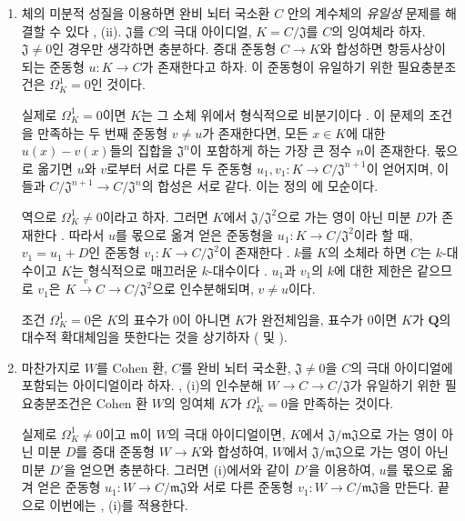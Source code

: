 \begin{remarks}[21.5.3]
\label{0.21.5.3-ko}
\begin{enumerate}
  \item[(i)] 체의 미분적 성질을 이용하면 완비 뇌터 국소환 $C$ 안의
  계수체의 \emph{유일성} 문제를 해결할 수 있다
  , (ii). $\mathfrak J$를 $C$의 극대 아이디얼,
  $K=C/\mathfrak J$를 $C$의 잉여체라 하자. $\mathfrak J\neq0$인 경우만
  생각하면 충분하다. 증대 준동형 $C\to K$와 합성하면 항등사상이 되는
  준동형 $u:K\to C$가 존재한다고 하자. 이 준동형이 유일하기 위한
  필요충분조건은 $\Omega^1_K=0$인 것이다.

  실제로 $\Omega^1_K=0$이면 $K$는 그 소체 위에서 형식적으로
  비분기이다 . 이 문제의 조건을 만족하는 두 번째
  준동형 $v\neq u$가 존재한다면, 모든 $x\in K$에 대한 $u(x)-v(x)$들의
  집합을 $\mathfrak J^n$이 포함하게 하는 가장 큰 정수 $n$이 존재한다.
  몫으로 옮기면 $u$와 $v$로부터 서로 다른 두 준동형
  $u_1,v_1:K\to C/\mathfrak J^{n+1}$이 얻어지며, 이들과
  $C/\mathfrak J^{n+1}\to C/\mathfrak J^n$의 합성은 서로 같다. 이는
  정의 에 모순이다.

  역으로 $\Omega^1_K\neq0$이라고 하자. 그러면 $K$에서
  $\mathfrak J/\mathfrak J^2$으로 가는 영이 아닌 미분 $D$가 존재한다
  . 따라서 $u$를 몫으로 옮겨 얻은 준동형을
  $u_1:K\to C/\mathfrak J^2$이라 할 때,
  $v_1=u_1+D$인 준동형 $v_1:K\to C/\mathfrak J^2$이 존재한다
  . $k$를 $K$의 소체라 하면 $C$는 $k$-대수이고
  $K$는 형식적으로 매끄러운 $k$-대수이다 .
  $u_1$과 $v_1$의 $k$에 대한 제한은 같으므로 $v_1$은
  $K\xrightarrow{v}C\to C/\mathfrak J^2$으로 인수분해되며,
  $v\neq u$이다.

  조건 $\Omega^1_K=0$은 $K$의 표수가 $0$이 아니면 $K$가
  완전체임을, 표수가 $0$이면 $K$가 $\mathbf Q$의 대수적 확대체임을
  뜻한다는 것을 상기하자
  ( 및 ).

  \item[(ii)] 마찬가지로 $W$를 Cohen 환, $C$를 완비 뇌터 국소환,
  $\mathfrak J\neq0$을 $C$의 극대 아이디얼에 포함되는 아이디얼이라
  하자. , (i)의 인수분해
  $W\to C\to C/\mathfrak J$가 유일하기 위한 필요충분조건은 Cohen 환
  $W$의 잉여체 $K$가 $\Omega^1_K=0$을 만족하는 것이다.

  실제로 $\Omega^1_K\neq0$이고 $\mathfrak m$이 $W$의 극대
  아이디얼이면, $K$에서 $\mathfrak J/\mathfrak m\mathfrak J$으로 가는
  영이 아닌 미분 $D$를 증대 준동형 $W\to K$와 합성하여, $W$에서
  $\mathfrak J/\mathfrak m\mathfrak J$으로 가는 영이 아닌 미분 $D'$을
  얻으면 충분하다. 그러면 (i)에서와 같이 $D'$을 이용하여, $u$를
  몫으로 옮겨 얻은 준동형
  $u_1:W\to C/\mathfrak m\mathfrak J$와 서로 다른 준동형
  $v_1:W\to C/\mathfrak m\mathfrak J$을 만든다. 끝으로 이번에는
  , (i)를 적용한다.


\end{enumerate}
\end{remarks}
